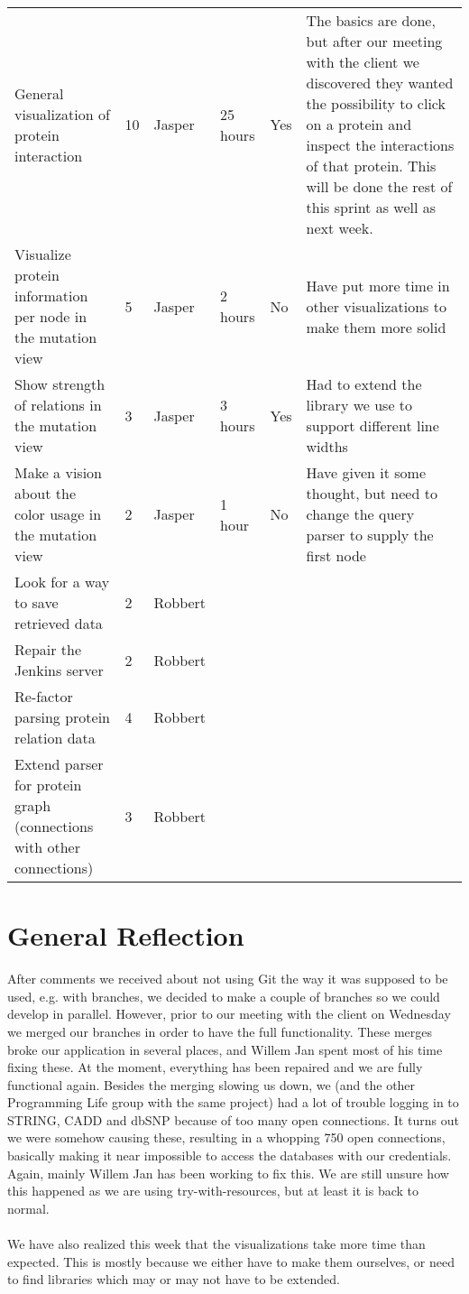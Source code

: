 \documentclass[a4paper]{report}
\begin{document}
\begin{landscape}
\begin{longtable}{p{6cm}|l|l|l|p{2cm}|p{7cm}}
General visualization of protein interaction & 10 & Jasper & 25 hours & Yes & The basics are done, but after our meeting with the client we discovered they wanted the possibility to click on a protein and inspect the interactions of that protein. This will be done the rest of this sprint as well as next week.\\
Visualize protein information per node in the mutation view & 5 & Jasper & 2 hours & No & Have put more time in other visualizations to make them more solid\\
Show strength of relations in the mutation view & 3 & Jasper & 3 hours & Yes & Had to extend the library we use to support different line widths\\
Make a vision about the color usage in the mutation view & 2 & Jasper & 1 hour & No & Have given it some thought, but need to change the query parser to supply the first node\\
Look for a way to save retrieved data & 2 & Robbert \\
Repair the Jenkins server & 2 & Robbert \\
Re-factor parsing protein relation data & 4 & Robbert \\
Extend parser for protein graph (connections with other connections) & 3 & Robbert
\end{longtable}
\end{landscape}

\section*{General Reflection}
After comments we received about not using Git the way it was supposed to be used, e.g. with branches, we decided to make a couple of branches so we could develop in parallel. However, prior to our meeting with the client on Wednesday we merged our branches in order to have the full functionality. These merges broke our application in several places, and Willem Jan spent most of his time fixing these. At the moment, everything has been repaired and we are fully functional again. Besides the merging slowing us down, we (and the other Programming Life group with the same project) had a lot of trouble logging in to STRING, CADD and dbSNP because of too many open connections. It turns out we were somehow causing these, resulting in a whopping 750 open connections, basically making it near impossible to access the databases with our credentials. Again, mainly Willem Jan has been working to fix this. We are still unsure how this happened as we are using try-with-resources, but at least it is back to normal.\\\\
We have also realized this week that the visualizations take more time than expected. This is mostly because we either have to make them ourselves, or need to find libraries which may or may not have to be extended.
\end{document}
